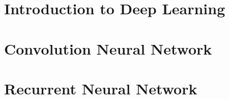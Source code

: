 % 

\section[Intro]{Introduction to Deep Learning}
% 
% 
% 
% 

% 
% 
% 

\section[CNN]{Convolution Neural Network}
% 



\section[RNN]{Recurrent Neural Network}
% 
% 
% 

% 
% 

 
 
% 


